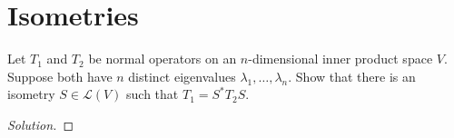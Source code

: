 \documentclass{article}
\newenvironment{solution}{\begin{proof}[Solution]}{\end{proof}}
\begin{document}
\newpage

\section{Isometries}
\begin{hw}
	Let $T_{1}$ and $T_{2}$ be normal operators on an $n$-dimensional inner product space $V$. Suppose both have $n$ distinct eigenvalues $\lambda_1,\ldots,\lambda_n$. Show that there is an isometry $S \in \mathcal L(V)$ such that $T_{1} = S^{*}T_{2}S$.
\end{hw}
\begin{solution}
	\begin{comment}
		To begin with, we note that since $T_{1}, T_{2}$ are normal operators on an $n$-dimensional inner product space $V$, and they both have $n$ distinct eigenvalues $\lambda_{1}, \ldots, \lambda_n$, we observe then that each of the eigenvectors of $T_{1}, T_{2}$ corresponding to each of the distinct eigenvalues are thus orthogonal, and thus form a basis for $V$.
	
	Now, with this in mind, we observe then that since $V$ has a basis formed by the eigenvectors of $T_{1}, T_{2}$, it follows then they are diagonalisable. Furthermore, they have a diagonal matrix representation $D$. Note that they share a diagonal matrix representation due to sharing the same eigenvalues.
	
	From here, since $T_{1}, T_{2}$ are diagonalisable, it means then that there exists some invertible matrix $P$ such that $T_{1} = P_{1}DP_{1}^{-1}$ and $T_{2} = P_{2}DP_{2}^{-1}$.
	
	Next, we recall that for a unitary matrix $S$, we have that $S^{-1} = S^{*}$. Then, from here, we observe that there exists unitary matrices $S_{1}, S_{2}$ such that we have the following:
	\begin{align*}
		T_{1} &= S_{1} D S_{1}^{*} \\
		T_{2} &= S_{2} D S_{2}^{*}
	\end{align*} 

	Then, we observe that since $S$ is unitary, it follows that $SS^{*} = S^{*}S = I$. So, we have:
	\begin{align*}
		S_{2}^{*}T_{2}S_{2} &= S_{2}^{*}S_{2} D S_{2}^{*}S_{2} \\
		&= IDI \\
		&= D
	\end{align*}

	And with this in mind, we thus see that:
	\begin{align*}
		T_{1} &= S_{1}DS_{1}^{*} \\
		&= S_{1}(S_{2}^{*} D S_{2})S_{1}^{*} \\
		&= (S_{1}S_{2}^{*}) D (S_{2}S_{1}^{*}) \\
		&= (S_{2}S_{1}^{*})^{*} D (S_{2}S_{1}^{*})
	\end{align*}


\end{comment}
\end{solution}
\end{document}
